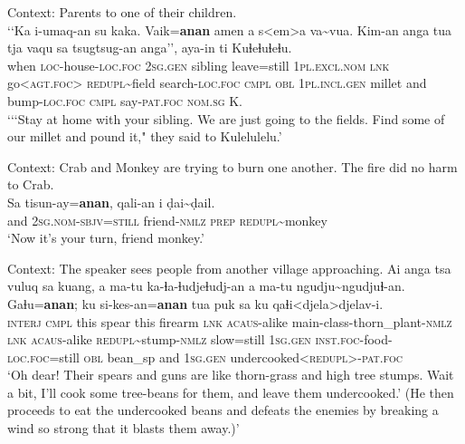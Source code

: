 \largerpage[2.25]
\begin{exe}
	\ex\label{exAppendixPaiwanAnnounce1}
	 Context: Parents to one of their children.\\
	\gll \lq\lq Ka i-umaq-an su kaka. Vaik=\textbf{anan} amen a s<em>a va\sim{}vua. Kim-an anga tua tja vaqu sa tsugtsug-an anga\rq\rq, aya-in ti Kuɬeɬuɬeɬu.\\
	\phantom{\lq\lq}when \textsc{loc}-house-\textsc{loc}.\textsc{foc} 2\textsc{sg}.\textsc{gen} sibling leave=still 1\textsc{pl}.\textsc{excl}.\textsc{nom} \textsc{lnk} go<\textsc{agt}.\textsc{foc}> \textsc{redupl}\sim{}field search-\textsc{loc}.\textsc{foc} \textsc{cmpl} \textsc{obl} 1\textsc{pl}.\textsc{incl}.\textsc{gen} millet and bump-\textsc{loc}.\textsc{foc} \textsc{cmpl} say-\textsc{pat}.\textsc{foc} \textsc{nom}.\textsc{sg} K.\\
	\glt \lq \lq\lq Stay at home with your sibling. We are just going to the fields. Find some of our millet and pound it," they said to Kulelulelu.' \parencite[210]{EarlyWhitehorn2003}

	\ex\label{exAppendixPaiwanAnnounce3}
	 Context: Crab and Monkey are trying to burn one another. The fire did no harm to Crab.\\
	\gll Sa tisun-ay=\textbf{anan}, qali-an i ḍai\sim{}ḍail.\\
	and 2\textsc{sg}.\textsc{nom}-\textsc{sbjv}=\textsc{still} friend-\textsc{nmlz} \textsc{prep} \textsc{redupl}\sim{}monkey\\
	\glt [Crab:] \lq Now it’s your turn, friend monkey.\rq{ }\parencite[197]{EarlyWhitehorn2003}

	\ex\label{exAppendixPaiwanAnnounce4}
	Context: The speaker sees people from another village approaching.
	\gll  Ai anga tsa vuluq sa kuang, a ma-tu ka-ɬa-ɬudjeɬudj-an a ma-tu ngudju\sim{}ngudjuɬ-an. Gaɬu=\textbf{anan}; ku si-kes-an=\textbf{anan} tua puk sa ku qaɬi<djela>djelav-i.\\
	\textsc{interj} \textsc{cmpl} this spear this firearm \textsc{lnk} \textsc{acaus}-alike main-class-thorn\_plant-\textsc{nmlz} \textsc{lnk} \textsc{acaus}-alike \textsc{redupl}\sim{}stump-\textsc{nmlz} slow=still 1\textsc{sg}.\textsc{gen} \textsc{inst}.\textsc{foc}-food-\textsc{loc}.\textsc{foc}=still \textsc{obl} bean\_sp and 1\textsc{sg}.\textsc{gen} undercooked<\textsc{redupl}>-\textsc{pat}.\textsc{foc}\\
	\glt \lq Oh dear! Their spears and guns are like thorn-grass and high tree stumps. Wait a bit, I’ll cook some tree-beans for them, and leave them undercooked.' (He then proceeds to eat the undercooked beans and defeats the enemies by breaking a wind so strong that it blasts them away.)\rq{ }\parencite[229]{EarlyWhitehorn2003}
\end{exe}

